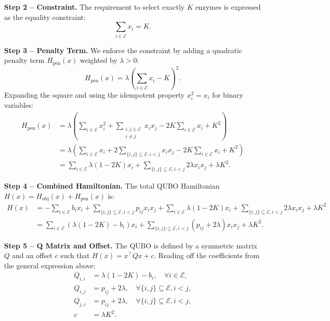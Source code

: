 \documentclass[12pt]{article}
\begin{document}
\textbf{Step 2 -- Constraint.}
The requirement to select exactly $K$ enzymes is expressed as the equality constraint:
\begin{equation}
    \sum_{i \in \mathcal{E}} x_i = K.
\end{equation}

\textbf{Step 3 -- Penalty Term.}
We enforce the constraint by adding a quadratic penalty term $H_{\text{pen}}(x)$ weighted by $\lambda > 0$:
\begin{equation}
    H_{\text{pen}}(x) = \lambda \left( \sum_{i \in \mathcal{E}} x_i - K \right)^2.
\end{equation}
Expanding the square and using the idempotent property $x_i^2 = x_i$ for binary variables:
\begin{align}
    H_{\text{pen}}(x) &= \lambda \left( \sum_{i \in \mathcal{E}} x_i^2 + \sum_{\substack{i,j \in \mathcal{E} \\ i \neq j}} x_i x_j - 2K \sum_{i \in \mathcal{E}} x_i + K^2 \right) \\
    &= \lambda \left( \sum_{i \in \mathcal{E}} x_i + 2 \sum_{\{i,j\} \subseteq \mathcal{E}, i < j} x_i x_j - 2K \sum_{i \in \mathcal{E}} x_i + K^2 \right) \\
    &= \sum_{i \in \mathcal{E}} \lambda(1 - 2K) x_i + \sum_{\{i,j\} \subseteq \mathcal{E}, i < j} 2\lambda x_i x_j + \lambda K^2.
\end{align}

\textbf{Step 4 -- Combined Hamiltonian.}
The total QUBO Hamiltonian $H(x) = H_{\text{obj}}(x) + H_{\text{pen}}(x)$ is:
\begin{align}
    H(x) &= -\sum_{i \in \mathcal{E}} b_i x_i + \sum_{\{i,j\} \subseteq \mathcal{E}, i < j} p_{ij} x_i x_j + \sum_{i \in \mathcal{E}} \lambda(1 - 2K) x_i + \sum_{\{i,j\} \subseteq \mathcal{E}, i < j} 2\lambda x_i x_j + \lambda K^2 \\
    &= \sum_{i \in \mathcal{E}} \left( \lambda(1 - 2K) - b_i \right) x_i + \sum_{\{i,j\} \subseteq \mathcal{E}, i < j} \left( p_{ij} + 2\lambda \right) x_i x_j + \lambda K^2.
\end{align}

\textbf{Step 5 -- Q Matrix and Offset.}
The QUBO is defined by a symmetric matrix $Q$ and an offset $c$ such that $H(x) = x^\top Q x + c$. Reading off the coefficients from the general expression above:
\begin{align}
    Q_{i,i} &= \lambda(1 - 2K) - b_i, \quad \forall i \in \mathcal{E}, \\
    Q_{i,j} &= p_{ij} + 2\lambda, \quad \forall \{i,j\} \subseteq \mathcal{E}, i < j, \\
    Q_{j,i} &= p_{ij} + 2\lambda, \quad \forall \{i,j\} \subseteq \mathcal{E}, i < j, \\
    c &= \lambda K^2.
\end{align}
\end{document}
